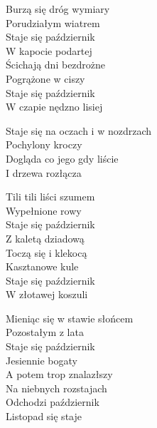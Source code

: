 \begin{textn}
    \ifchorded{\hfill\break}
    Burzą się dróg wymiary\\
    Porudziałym wiatrem\\
    Staje się październik\\
    W kapocie podartej\\
    Ścichają dni bezdrożne\\
    Pogrążone w ciszy\\
    Staje się październik\\
    W czapie nędzno lisiej

    \vin Staje się na oczach i w nozdrzach\\
    \vin Pochylony kroczy\\
    \vin Dogląda co jego gdy liście\\
    \vin I drzewa rozłącza

    Tili tili liści szumem\\
    Wypełnione rowy\\
    Staje się październik\\
    Z kaletą dziadową\\
    Toczą się i klekocą\\
    Kasztanowe kule\\
    Staje się październik\\
    W złotawej koszuli

    Mieniąc się w stawie słońcem\\
    Pozostałym z lata\\
    Staje się październik\\
    Jesiennie bogaty\\
    A potem trop znalazłszy\\
    Na niebnych rozstajach\\
    Odchodzi październik\\
    Listopad się staje
\end{textn}
